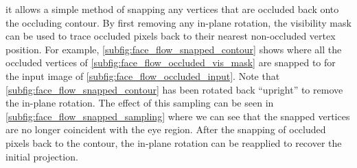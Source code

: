 it allows a simple method of snapping any vertices that are occluded back
onto the occluding contour. By first removing any in-plane rotation, the
visibility mask can be used to trace occluded pixels back to their nearest
non-occluded vertex position. For example, \cref{subfig:face_flow_snapped_contour}
shows where all the occluded vertices of \cref{subfig:face_flow_occluded_vis_mask}
are snapped to for the input image of \cref{subfig:face_flow_occluded_input}.
Note that \cref{subfig:face_flow_snapped_contour} has been rotated back
``upright'' to remove the in-plane rotation. The effect of this sampling can be seen in
\cref{subfig:face_flow_snapped_sampling} where we can see that the snapped
vertices are no longer coincident with the eye region. After the snapping of
occluded pixels back to the contour, the in-plane rotation can be reapplied
to recover the initial projection.
\setlength{\tabcolsep}{2pt}

